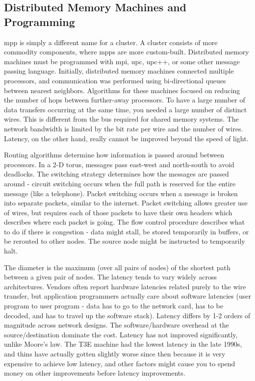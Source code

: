 \documentclass[10pt]{article}
\begin{document}
\begin{flushleft}
\section{Distributed Memory Machines and Programming}

\gls{mpp} is simply a different name for a cluster. A cluster consists of more commodity components, where \gls{mpp}s are more custom-built. Distributed memory machines must be programmed with \gls{mpi}, \gls{upc}, \gls{upc}++, or some other message passing language. Initially, distributed memory machines connected multiple processors, and communication was performed using bi-directional queues between nearest neighbors. Algorithms for these machines focused on reducing the number of hops between further-away processors. To have a large number of data transfers occurring at the same time, you needed a large number of distinct wires. This is different from the bus required for shared memory systems. The network bandwidth is limited by the bit rate per wire and the number of wires. Latency, on the other hand, really cannot be improved beyond the speed of light.

Routing algorithms determine how information is passed around between processors. In a 2-D torus, messages pass east-west and north-south to avoid deadlocks. The switching strategy determines how the messages are passed around - circuit switching occurs when the full path is reserved for the entire message (like a telephone). Packet switching occurs when a message is broken into separate packets, similar to the internet. Packet switching allows greater use of wires, but requires each of those packets to have their own headers which describes where each packet is going. The flow control procedure describes what to do if there is congestion - data might stall, be stored temporarily in buffers, or be rerouted to other nodes. The source node might be instructed to temporarily halt.

The diameter is the maximum (over all pairs of nodes) of the shortest path between a given pair of nodes. The latency tends to vary widely across architectures. Vendors often report hardware latencies related purely to the wire transfer, but application programmers actually care about software latencies (user program to user program - data has to go to the network card, has to be decoded, and has to travel up the software stack). Latency differs by 1-2 orders of magnitude across network designs. The software/hardware overhead at the source/destination dominate the cost. Latency has not improved significantly, unlike Moore's law. The T3E machine had the lowest latency in the late 1990s, and thins have actually gotten slightly worse since then because it is very expensive to achieve low latency, and other factors might cause you to spend money on other improvements before latency improvements.


\end{flushleft}
\end{document}
